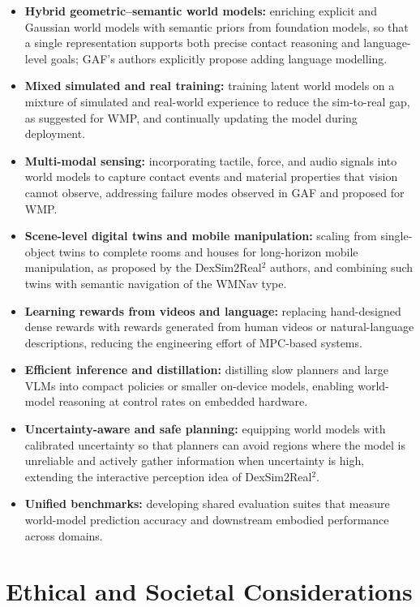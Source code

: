 \documentclass[12pt,a4paper,final]{extreport}
\begin{document}
\begin{itemize}
  \item \textbf{Hybrid geometric--semantic world models:} enriching explicit and Gaussian world models with semantic priors from foundation models, so that a single representation supports both precise contact reasoning and language-level goals; GAF's authors explicitly propose adding language modelling.
  \item \textbf{Mixed simulated and real training:} training latent world models on a mixture of simulated and real-world experience to reduce the sim-to-real gap, as suggested for WMP, and continually updating the model during deployment.
  \item \textbf{Multi-modal sensing:} incorporating tactile, force, and audio signals into world models to capture contact events and material properties that vision cannot observe, addressing failure modes observed in GAF and proposed for WMP.
  \item \textbf{Scene-level digital twins and mobile manipulation:} scaling from single-object twins to complete rooms and houses for long-horizon mobile manipulation, as proposed by the DexSim2Real$^2$ authors, and combining such twins with semantic navigation of the WMNav type.
  \item \textbf{Learning rewards from videos and language:} replacing hand-designed dense rewards with rewards generated from human videos or natural-language descriptions, reducing the engineering effort of MPC-based systems.
  \item \textbf{Efficient inference and distillation:} distilling slow planners and large VLMs into compact policies or smaller on-device models, enabling world-model reasoning at control rates on embedded hardware.
  \item \textbf{Uncertainty-aware and safe planning:} equipping world models with calibrated uncertainty so that planners can avoid regions where the model is unreliable and actively gather information when uncertainty is high, extending the interactive perception idea of DexSim2Real$^2$.
  \item \textbf{Unified benchmarks:} developing shared evaluation suites that measure world-model prediction accuracy and downstream embodied performance across domains.
\end{itemize}

\section{Ethical and Societal Considerations}
\end{document}
